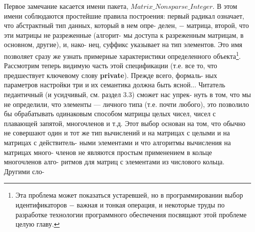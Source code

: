 \documentclass{./git_rep/mai_prac_2017/template/mai_book}
\begin{document}
Первое замечание касается имени пакета, $Matrix\_Nonsparse\_Integer$.\linebreak
В  этом  имени  соблюдаются  простейшие  правила  построения:  первый\linebreak
радикал означает,  что  абстрактный  тип  данных,  который в  нем  опре-\linebreak
делен, $-$ матрица, второй, что эти матрицы не разреженные  (алгорит-\linebreak
мы  доступа  к  разреженным  матрицам,  в  основном,  другие),  и,  нако-\linebreak
нец, суффикс указывает на тип элементов. Это имя позволяет сразу же\linebreak
узнать примерные характеристики  определенного объекта\footnote{
Эта  проблема  может  показаться  устаревшей,  но  в  программировании  выбор\linebreak
идентификаторов $-$ важная и  тонкая операция, и  некоторые труды по  разработке\linebreak
технологии программного обеспечения посвящают этой проблеме целую  главу.}.\newline
Рассмотрим теперь видимую часть этой спецификации  (т.е.  все то,\linebreak
что предшествует  ключевому слову \textbf{private}). Прежде  всего,  формаль-\linebreak
\noindent
ных параметров  настройки  три  и  их  семантика  должна  быть ясной...\linebreak
Читатель педантичный  (и усидчивый, см. раздел 3.3) сможет нас упрек­-\linebreak
нуть  в  том,  что мы  не  определили,  что элементы  — личного типа  (т.е.\linebreak
почти  любого),  это  позволило  бы  обрабатывать одинаковым  способом\linebreak
матрицы  целых  чисел,  чисел  с  плавающей  запятой,  многочленов и  т.д.\linebreak
Этот выбор  основан  на  том,  что  обычно  не  совершают  один  и  тот же\linebreak
тип  вычислений  и  на матрицах с целыми  и  на  матрицах с  действитель­-\linebreak
ными  элементами  и  что  алгоритмы  вычисления  на  матрицах  много­-\linebreak
членов  не являются  простым  применением  в  кольце  многочленов  алго­-\linebreak
ритмов  для  матриц  с  элементами  из  числового  кольца.  Другими  сло­-\linebreak
\end{document}

